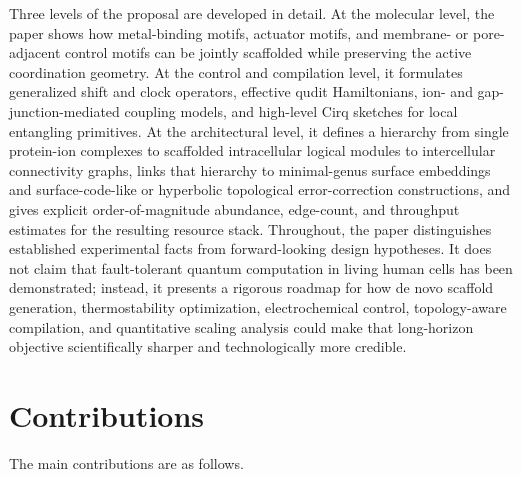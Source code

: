 \documentclass[11pt]{report}
\theoremstyle{definition}
\begin{document}
Three levels of the proposal are developed in detail. At the molecular level, the paper shows how metal-binding motifs, actuator motifs, and membrane- or pore-adjacent control motifs can be jointly scaffolded while preserving the active coordination geometry. At the control and compilation level, it formulates generalized shift and clock operators, effective qudit Hamiltonians, ion- and gap-junction-mediated coupling models, and high-level Cirq sketches for local entangling primitives. At the architectural level, it defines a hierarchy from single protein-ion complexes to scaffolded intracellular logical modules to intercellular connectivity graphs, links that hierarchy to minimal-genus surface embeddings and surface-code-like or hyperbolic topological error-correction constructions, and gives explicit order-of-magnitude abundance, edge-count, and throughput estimates for the resulting resource stack. Throughout, the paper distinguishes established experimental facts from forward-looking design hypotheses. It does not claim that fault-tolerant quantum computation in living human cells has been demonstrated; instead, it presents a rigorous roadmap for how de novo scaffold generation, thermostability optimization, electrochemical control, topology-aware compilation, and quantitative scaling analysis could make that long-horizon objective scientifically sharper and technologically more credible.

\chapter*{Contributions}
The main contributions are as follows.
\end{document}

